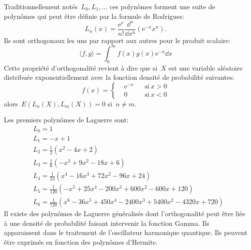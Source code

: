 Traditionnellement notés~$L_0,L_1,\dots$ ces polynômes forment une suite de polynômes qui peut être définie par la formule de Rodrigues: 
\begin{equation}
 L_n(x)=\frac{\mathrm{e}^x}{n!}\frac{\dd^n}{\dd x^n}\left(\mathrm{e}^{-x} x^n\right). 
\end{equation}
Ils sont orthogonaux les uns par rapport aux autres pour le produit scalaire: 
\begin{equation}
\langle f,g \rangle = \int_0^\infty f(x) g(x) \mathrm{e}^{-x}\dd x 
\end{equation}
Cette propriété d'orthogonalité revient à dire que si~$X$ est une variable aléatoire distribuée exponentiellement avec la fonction densité de probabilité suivantes: 
\begin{equation}
 f(x)=\left\{
\begin{aligned}
& \mathrm{e}^{-x} && \mbox{si}\ x>0\\
&0 && \mbox{si}\ x<0
\end{aligned}\right. 
\end{equation}
alors~$E(L_n(X),L_m(X))=0$ si~$n\neq m$. 

\noindent
Les premiers polynômes de Laguerre sont:
\begin{equation}
\begin{aligned}
&L_0 =	1\\
&L_1= 	-x+1\\
&L_2= 	\frac12 (x^2-4x+2)\\
&L_3= 	\frac16 (-x^3+9x^2-18x+6)\\
&L_4= 	\frac1{24} (x^4-16x^3+72x^2-96x+24)\\
&L_5= 	\frac1{120} (-x^5+25x^4-200x^3+600x^2-600x+120)\\
&L_6= 	\frac1{720} (x^6-36x^5+450x^4-2400x^3+5400x^2-4320x+720)
\end{aligned}
\end{equation}
Il existe des polynômes de Laguerre généralisés dont l'orthogonalité peut être liée à une densité de probabilité faisant intervenir la fonction Gamma. Ils apparaissent dans le traitement de l'oscillateur harmonique quantique. Ils peuvent être exprimés en fonction des polynômes d'Hermite. 
